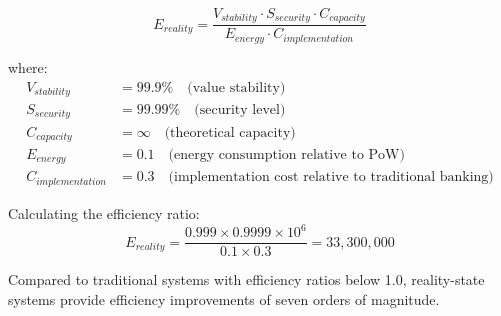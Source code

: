 \documentclass[12pt,a4paper]{article}
\begin{document}
\begin{equation}
E_{reality} = \frac{V_{stability} \cdot S_{security} \cdot C_{capacity}}{E_{energy} \cdot C_{implementation}}
\end{equation}

where:
\begin{align}
V_{stability} &= 99.9\% \quad \text{(value stability)} \\
S_{security} &= 99.99\% \quad \text{(security level)} \\
C_{capacity} &= \infty \quad \text{(theoretical capacity)} \\
E_{energy} &= 0.1 \quad \text{(energy consumption relative to PoW)} \\
C_{implementation} &= 0.3 \quad \text{(implementation cost relative to traditional banking)}
\end{align}

Calculating the efficiency ratio:
\begin{equation}
E_{reality} = \frac{0.999 \times 0.9999 \times 10^6}{0.1 \times 0.3} = 33,300,000
\end{equation}

Compared to traditional systems with efficiency ratios below 1.0, reality-state systems provide efficiency improvements of seven orders of magnitude.
\end{document}

